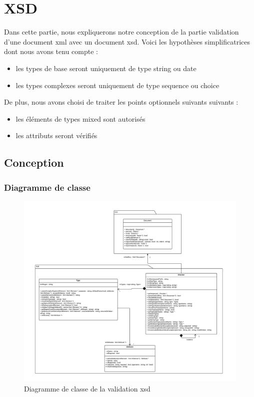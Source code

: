 \chapter{XSD}

Dans cette partie, nous expliquerons notre conception de la partie validation d'une document xml avec un document xsd. Voici les hypothèses simplificatrices dont nous avons tenu compte :
\begin{itemize}
    \item{les types de base seront uniquement de type string ou date}
    \item{les types complexes seront uniquement de type sequence ou choice}
\end{itemize}
De plus, nous avons choisi de traiter les points optionnels suivants suivants :
\begin{itemize}
    \item{les éléments de types mixed sont autorisés}
    \item{les attributs seront vérifiés}
\end{itemize}

\section{Conception}

    \subsection{Diagramme de classe}

    \begin{figure}[H]
        \centering
        \includegraphics[width=1.1\linewidth]{images/xsd-uml.pdf}
        \caption{Diagramme de classe de la validation xsd}
        \label{classDiagram}
    \end{figure}

